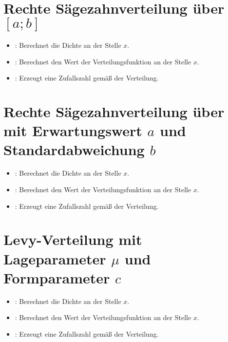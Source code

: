 \section{Rechte Sägezahnverteilung über \texorpdfstring{$[a;b]$}{[a;b]}}

\begin{itemize}

\item
{}:
Berechnet die Dichte an der Stelle $x$.

\item
{}:
Berechnet den Wert der Verteilungsfunktion an der Stelle $x$.

\item
{}:
Erzeugt eine Zufallszahl gemäß der Verteilung.

\end{itemize}



\section{Rechte Sägezahnverteilung über mit Erwartungswert \texorpdfstring{$a$}{a} und Standardabweichung \texorpdfstring{$b$}{b}}

\begin{itemize}

\item
{}:
Berechnet die Dichte an der Stelle $x$.

\item
{}:
Berechnet den Wert der Verteilungsfunktion an der Stelle $x$.

\item
{}:
Erzeugt eine Zufallszahl gemäß der Verteilung.

\end{itemize}



\section{Levy-Verteilung mit Lageparameter \texorpdfstring{$\mu$}{mu} und Formparameter \texorpdfstring{$c$}{c}}

\begin{itemize}

\item
{}:
Berechnet die Dichte an der Stelle $x$.

\item
{}:
Berechnet den Wert der Verteilungsfunktion an der Stelle $x$.

\item
{}:
Erzeugt eine Zufallszahl gemäß der Verteilung.

\end{itemize}



